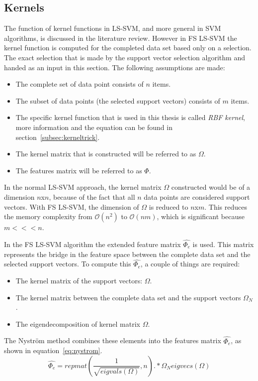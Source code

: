 \subsection{Kernels} \label{subsec:kernels}
The function of kernel functions in LS-SVM, and more general in SVM algorithms, is discussed in the literature review.
However in FS LS-SVM the kernel function is computed for the completed data set based only on a selection.
The exact selection that is made by the support vector selection algorithm and handed as an input in this section.
The following assumptions are made:
\begin{itemize}
	\item The complete set of data point consists of $n$ items.
	\item The subset of data points (the selected support vectors) consists of $m$ items.
	\item The specific kernel function that is used in this thesis is called \textit{RBF kernel}, more information and the equation can be found in section~\ref{subsec:kerneltrick}.
	\item The kernel matrix that is constructed will be referred to as $\Omega$.
	\item The features matrix will be referred to as $\Phi$.
\end{itemize}
In the normal LS-SVM approach, the kernel matrix $\Omega$ constructed would be of a dimension $n$x$n$, because of the fact that all $n$ data points are considered support vectors.
With FS LS-SVM, the dimension of $\Omega$ is reduced to $n$x$m$.
This reduces the memory complexity from $\mathcal{O}(n^2)$ to $\mathcal{O}(nm)$, which is significant because $m<<<n$.
\par 
In the FS LS-SVM algorithm the extended feature matrix $\hat{\Phi_e}$ is used.
This matrix represents the bridge in the feature space between the complete data set and the selected support vectors.
To compute this $\hat{\Phi_e}$, a couple of things are required: 
\begin{itemize}
	\item The kernel matrix of the support vectors: $\Omega$.
	\item The kernel matrix between the complete data set and the support vectors $\Omega_N$.
	\item The eigendecomposition of kernel matrix $\Omega$.
\end{itemize}
The Nystr\"om method combines these elements into the features matrix $\hat{\Phi_e}$, as shown in equation~\ref{eq:nystrom}.
\begin{equation}
	\hat{\Phi_e}= repmat(\frac{1}{\sqrt{eigvals(\Omega)}},n).*\Omega_N eigvecs(\Omega)
	\label{eq:nystrom}
\end{equation}
